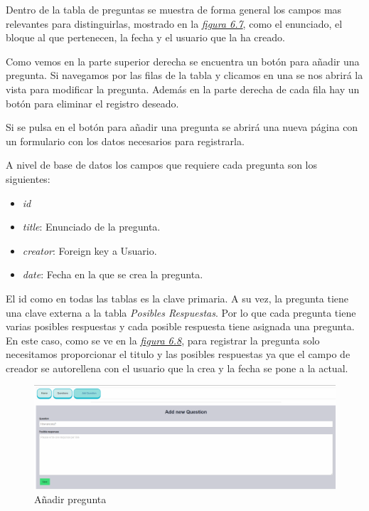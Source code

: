 Dentro de la tabla de preguntas se muestra de forma general los campos mas relevantes para distinguirlas, mostrado en la \textit{\hyperref[fig:vista-preguntas]{figura 6.7}}, como el enunciado, el bloque al que pertenecen, la fecha y el usuario que la ha creado. 

Como vemos en la parte superior derecha se encuentra un botón para añadir una pregunta. Si navegamos por las filas de la tabla y clicamos en una se nos abrirá la vista para modificar la pregunta. Además en la parte derecha de cada fila hay un botón para eliminar el registro deseado. 

Si se pulsa en el botón para añadir una pregunta se abrirá una nueva página con un formulario con los datos necesarios para registrarla. 


A nivel de base de datos los campos que requiere cada pregunta son los siguientes:\vspace{0.3cm}

\begin{itemize}
    \item \textit{id}
    \item  \textit{title}: Enunciado de la pregunta.
    \item \textit{creator}: Foreign key a Usuario.
    \item \textit{date}: Fecha en la que se crea la pregunta. 
\end{itemize}\vspace{0.3cm}

El id como en todas las tablas es la clave primaria. A su vez, la pregunta tiene una clave externa a la tabla \textit{Posibles Respuestas}. Por lo que cada pregunta tiene varias posibles respuestas y cada posible respuesta tiene asignada una pregunta. En este caso, como se ve en la \textit{\hyperref[fig:add-question]{figura 6.8}}, para registrar la pregunta solo necesitamos proporcionar el titulo y las posibles respuestas ya que el campo de creador se autorellena con el usuario que la crea y la fecha se pone a la actual.\vspace{1cm}

\begin{figure}[!ht]
    \centering
    \includegraphics[width=1\textwidth]{imagenes/add_pregunta.png}
    \caption{ Añadir pregunta}
    \label{fig:add-question}
\end{figure}\vspace{1cm}

